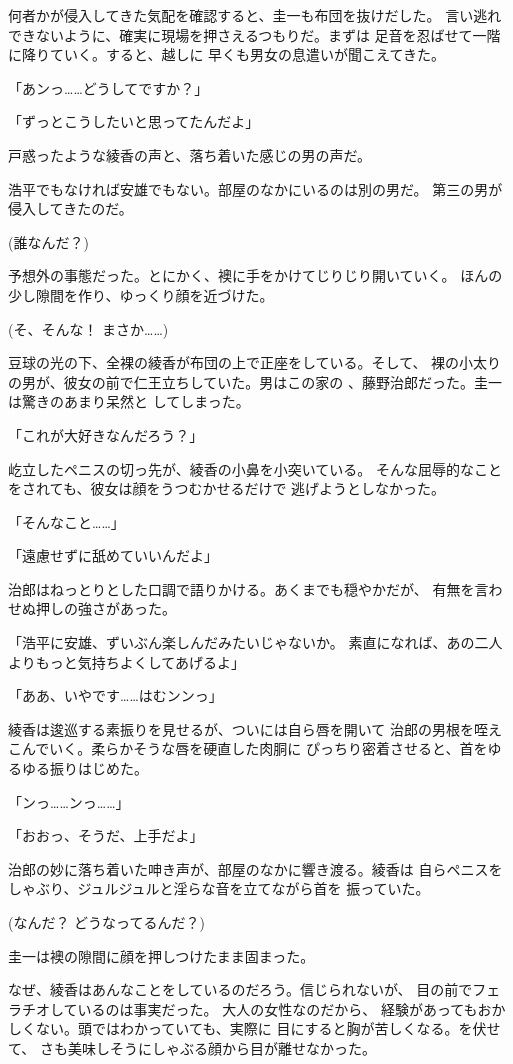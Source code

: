 ﻿\documentclass[
    book,tate,
    line_length=30zw,
    jafontsize=12pt,
    paper=b5j,
    landscape,
    ]{jlreq}
\begin{document}
何者かが侵入してきた気配を確認すると、圭一も布団を抜けだした。
言い逃れできないように、確実に現場を押さえるつもりだ。まずは
足音を忍ばせて一階に降りていく。すると、越しに
早くも男女の息遣いが聞こえてきた。

「あンっ……どうしてですか？」

「ずっとこうしたいと思ってたんだよ」

戸惑ったような綾香の声と、落ち着いた感じの男の声だ。

浩平でもなければ安雄でもない。部屋のなかにいるのは別の男だ。
第三の男が侵入してきたのだ。

(誰なんだ？)

予想外の事態だった。とにかく、襖に手をかけてじりじり開いていく。
ほんの少し隙間を作り、ゆっくり顔を近づけた。

(そ、そんな！ まさか……)

豆球の光の下、全裸の綾香が布団の上で正座をしている。そして、
裸の小太りの男が、彼女の前で仁王立ちしていた。男はこの家の
、藤野治郎だった。圭一は驚きのあまり呆然と
してしまった。

「これが大好きなんだろう？」

屹立したペニスの切っ先が、綾香の小鼻を小突いている。
そんな屈辱的なことをされても、彼女は顔をうつむかせるだけで
逃げようとしなかった。

「そんなこと……」

「遠慮せずに舐めていいんだよ」

治郎はねっとりとした口調で語りかける。あくまでも穏やかだが、
有無を言わせぬ押しの強さがあった。

「浩平に安雄、ずいぶん楽しんだみたいじゃないか。
素直になれば、あの二人よりもっと気持ちよくしてあげるよ」

「ああ、いやです……はむンンっ」

綾香は逡巡する素振りを見せるが、ついには自ら唇を開いて
治郎の男根を咥えこんでいく。柔らかそうな唇を硬直した肉胴に
ぴっちり密着させると、首をゆるゆる振りはじめた。

「ンっ……ンっ……」

「おおっ、そうだ、上手だよ」

治郎の妙に落ち着いた呻き声が、部屋のなかに響き渡る。綾香は
自らペニスをしゃぶり、ジュルジュルと淫らな音を立てながら首を
振っていた。

(なんだ？ どうなってるんだ？)

圭一は襖の隙間に顔を押しつけたまま固まった。

なぜ、綾香はあんなことをしているのだろう。信じられないが、
目の前でフェラチオしているのは事実だった。 大人の女性なのだから、
経験があってもおかしくない。頭ではわかっていても、実際に
目にすると胸が苦しくなる。を伏せて、
さも美味しそうにしゃぶる顔から目が離せなかった。
\end{document}

